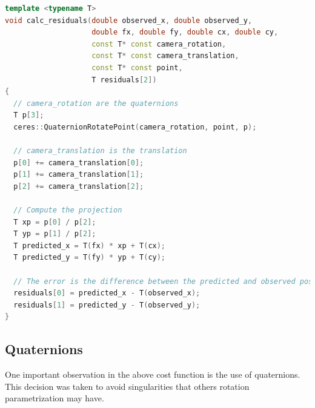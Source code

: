 \begin{lstlisting}[language=C++, label=code:cost_function, caption={Cost function}]
template <typename T>
void calc_residuals(double observed_x, double observed_y,
                    double fx, double fy, double cx, double cy,
                    const T* const camera_rotation,
                    const T* const camera_translation,
                    const T* const point,
                    T residuals[2])
{
  // camera_rotation are the quaternions
  T p[3];
  ceres::QuaternionRotatePoint(camera_rotation, point, p);

  // camera_translation is the translation
  p[0] += camera_translation[0];
  p[1] += camera_translation[1];
  p[2] += camera_translation[2];

  // Compute the projection
  T xp = p[0] / p[2];
  T yp = p[1] / p[2];
  T predicted_x = T(fx) * xp + T(cx);
  T predicted_y = T(fy) * yp + T(cy);

  // The error is the difference between the predicted and observed position.
  residuals[0] = predicted_x - T(observed_x);
  residuals[1] = predicted_y - T(observed_y);
}
\end{lstlisting}

\subsection*{Quaternions}

One important observation in the above cost function is the use of quaternions. This decision was taken to avoid singularities that others rotation parametrization may have.




%
%


